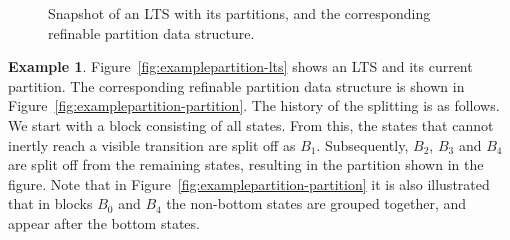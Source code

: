 \documentclass[a4paper,10pt]{article}
\theoremstyle{definition}
\newtheorem{example}[definition]{Example}
\theoremstyle{plain}
\begin{document}
\begin{figure}[!htp]
\begin{subfigure}{.6\linewidth}
		\end{subfigure}
	\caption{Snapshot of an LTS with its partitions, and the corresponding refinable partition data structure.\label{fig:examplepartition}}
	\end{figure}

\begin{example}
	Figure~\ref{fig:examplepartition-lts} shows an LTS and its current partition.
	The corresponding refinable partition data structure is shown in Figure~\ref{fig:examplepartition-partition}. The history of the splitting is as follows. We start with a block consisting of all states. From this, the states that cannot inertly reach a visible transition are split off as $B_1$. Subsequently, $B_2$, $B_3$ and $B_4$ are split off from the remaining states, resulting in the partition shown in the figure.
	Note that in Figure~\ref{fig:examplepartition-partition} it is also illustrated that in blocks $B_0$ and $B_4$ the non-bottom states are grouped together, and appear after the bottom states.
	\end{example}
\end{document}
